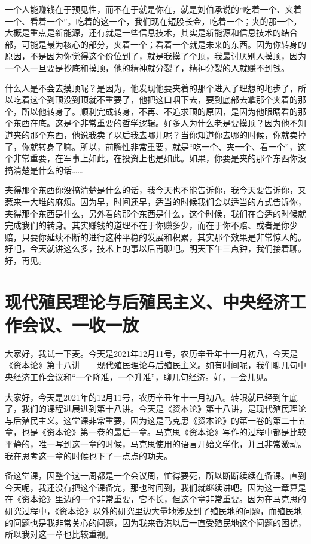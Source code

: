 \documentclass[UTF8, 12pt, a4paper]{ctexrep}
\begin{document}
一个人能赚钱在于预见性，而不在于就是你在，就是刘伯承说的“吃着一个、夹着一个、看着一个”。吃着的这一个，我们现在短股长金，吃着一个；夹的那一个，大概是重点是新能源，还有就是一些信息技术，其实是新能源和信息技术的结合部，可能是最为核心的部分，夹着一个；看着一个就是未来的东西。因为你转身的原因，不是因为你觉得这个价位到了，就是我摸了个顶，我最讨厌别人摸顶，因为一个人一旦要是抄底和摸顶，他的精神就分裂了，精神分裂的人就赚不到钱。

什么人是不会去摸顶呢？是因为，他发现他要夹着的那个进入了理想的地步了，所以吃着这个到顶没到顶就不重要了，他把这口咽下去，要到底部去拿那个夹着的那个，所以他转身了。顺利完成转身，不再、不追求顶的原因，是因为他眼睛看的那个东西在底。这是个非常重要的哲学逻辑。好多人为什么老是要摸顶？因为他不知道夹的那个东西，他说我卖了以后我去哪儿呢？当你知道你去哪的时候，你就卖掉了，你就转身了嘛。所以，前瞻性非常重要，就是“吃一个、夹一个、看一个”，这个非常重要，在军事上如此，在投资上也是如此。如果，你要是夹的那个东西你没搞清楚是什么的话……

夹得那个东西你没搞清楚是什么的话，我今天也不能告诉你，我今天要告诉你，又惹来一大堆的麻烦。因为早，时间还早，适当的时候我们会以适当的方式告诉你，夹得那个东西是什么，另外看的那个东西是什么，这个时候，我们在合适的时候就完成我们的转身。其实赚钱的道理不在于你赚多少，而在于你不赔、或者是你少赔，只要你延续不断的进行这种平稳的发展和积累，其实那个效果是非常惊人的。好吧，今天就讲这么多，技术上的事以后再聊吧。明天下午三点钟，我们接着聊。好，再见。

\section{现代殖民理论与后殖民主义、中央经济工作会议、一收一放}

大家好，我试一下麦。今天是2021年12月11号，农历辛丑年十一月初八，今天是《资本论》第十八讲——现代殖民理论与后殖民主义。如有时间呢，我们聊几句中央经济工作会议和“一个降准，一个升准”，聊几句经济。好，一会儿见。

大家好，今天是2021年的12月11号，农历辛丑年十一月初八。转眼就已经到年底了，我们的课程进展进到第十八讲。今天是《资本论》第十八讲，是现代殖民理论与后殖民主义。这堂课非常重要，因为这是马克思《资本论》的第一卷的第二十五章，也是《资本论》第一卷的最后一章。马克思《资本论》写作的过程中都是比较平静的，唯一写到这一章的时候，马克思使用的语言开始文学化，并且非常激动。我在思考这一章的时候也下了一点点的功夫。

备这堂课，因整个这一周都是一个会议周，忙得要死，所以断断续续在备课。直到今天呢，我还没有把这个课备完，那也时间到，我们就继续讲吧。因为这一章算是在《资本论》里边的一个非常重要，它不长，但这个章非常重要。因为在马克思的研究过程中，《资本论》以外的研究里边大量地涉及到了殖民地的问题，而殖民地的问题也是我非常关心的问题，因为我来香港以后一直受殖民地这个问题的困扰，所以我对这一章也比较重视。
\end{document}

